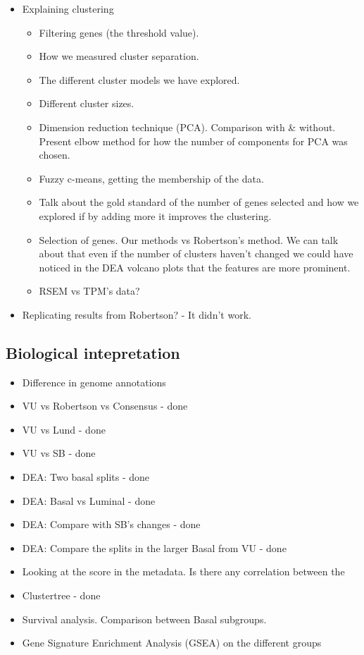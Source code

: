 \begin{itemize}
    \item Explaining clustering
        \begin{itemize}
            \item Filtering genes (the threshold value).
            \item How we measured cluster separation.
            \item The different cluster models we have explored. 
            \item Different cluster sizes.
            \item Dimension reduction technique (PCA). Comparison with \& without. Present elbow method for how the number of components for PCA was chosen.
            \item Fuzzy c-means, getting the membership of the data.
            \item Talk about the gold standard of the number of genes selected and how we explored if by adding more it improves the clustering.
            \item Selection of genes. Our methods vs Robertson's method. We can talk about that even if the number of clusters haven't changed we could have noticed in the DEA volcano plots that the features are more prominent.
            \item RSEM vs TPM's data?
        \end{itemize}
    \item Replicating results from Robertson? - It didn't work.
\end{itemize}


\subsection{Biological intepretation}


\begin{itemize}
    \item Difference in genome annotations
    \item VU vs Robertson vs Consensus - done
    \item VU vs Lund - done
    \item VU vs SB - done
    \item DEA: Two basal splits - done
    \item DEA: Basal vs Luminal - done
    \item DEA: Compare with SB's changes - done
    \item DEA: Compare the splits in the larger Basal from VU - done
    \item Looking at the score in the metadata. Is there any correlation between the 
    \item Clustertree - done
    \item Survival analysis. Comparison between Basal subgroups.
    \item Gene Signature Enrichment Analysis (GSEA) on the different groups 
\end{itemize}